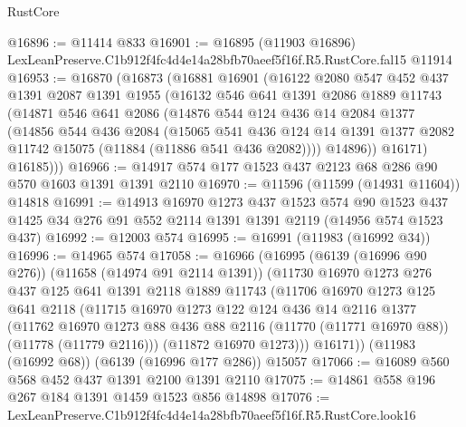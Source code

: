 \begin{lexlean}{RustCore}
\begin{coremodule}
@16896 := @11414 @833
@16901 := @16895
    (@11903 @16896)
    LexLeanPreserve.C1b912f4fc4d4e14a28bfb70aeef5f16f.R5.RustCore.fal15
    @11914
@16953 := @16870
    (@16873
      (@16881
        @16901
        (@16122
          @2080
          @547
          @452
          @437
          @1391
          @2087
          @1391
          @1955
          (@16132
            @546
            @641
            @1391
            @2086
            @1889
            @11743
            (@14871
              @546
              @641
              @2086
              (@14876
                @544
                @124
                @436
                @14
                @2084
                @1377
                (@14856
                  @544
                  @436
                  @2084
                  (@15065
                    @541
                    @436
                    @124
                    @14
                    @1391
                    @1377
                    @2082
                    @11742
                    @15075
                    (@11884 (@11886 @541 @436 @2082))))
                @14896))
            @16171)
          @16185)))
@16966 := @14917 @574 @177 @1523 @437 @2123 @68 @286 @90 @570 @1603 @1391 @1391 @2110
@16970 := @11596 (@11599 (@14931 @11604)) @14818
@16991 := @14913
    @16970
    @1273
    @437
    @1523
    @574
    @90
    @1523
    @437
    @1425
    @34
    @276
    @91
    @552
    @2114
    @1391
    @1391
    @2119
    (@14956 @574 @1523 @437)
@16992 := @12003 @574
@16995 := @16991 (@11983 (@16992 @34))
@16996 := @14965 @574
@17058 := @16966
    (@16995
      (@6139 (@16996 @90 @276))
      (@11658 (@14974 @91 @2114 @1391))
      (@11730
        @16970
        @1273
        @276
        @437
        @125
        @641
        @1391
        @2118
        @1889
        @11743
        (@11706
          @16970
          @1273
          @125
          @641
          @2118
          (@11715
            @16970
            @1273
            @122
            @124
            @436
            @14
            @2116
            @1377
            (@11762
              @16970
              @1273
              @88
              @436
              @88
              @2116
              (@11770 (@11771 @16970 @88))
              (@11778 (@11779 @2116)))
            (@11872 @16970 @1273)))
        @16171))
    (@11983 (@16992 @68))
    (@6139 (@16996 @177 @286))
    @15057
@17066 := @16089 @560 @568 @452 @437 @1391 @2100 @1391 @2110
@17075 := @14861 @558 @196 @267 @184 @1391 @1459 @1523 @856 @14898
@17076 := LexLeanPreserve.C1b912f4fc4d4e14a28bfb70aeef5f16f.R5.RustCore.look16

\end{coremodule}
\end{lexlean}
